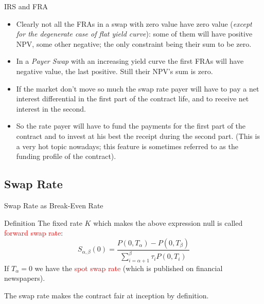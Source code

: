 \documentclass{beamer}
\begin{document}
\begin{frame}{IRS and FRA}
	\begin{itemize}
		\item<1-> Clearly not all the FRAs in a swap with zero value have zero value (\emph{except for the degenerate case of flat yield curve}): some of them will have positive NPV, some other negative; the only constraint being their sum to be zero.
		\item<2-> In a \emph{Payer Swap} with an increasing yield curve the first FRAs will have negative value, the last positive. Still their NPV's sum is zero.
		\item<3-> If the market don't move so much the swap rate payer will have to pay a net interest differential in the first part of the contract life, and to receive net interest in the second.
		\item<4-> So the rate payer will have to fund the payments for the first part of the contract and to invest at his best the receipt during the second part. (This is a very hot topic nowadays; this feature is sometimes referred to as the funding profile of the contract).
	\end{itemize}
\end{frame}

\subsection{Swap Rate}
\begin{frame}{Swap Rate as Break-Even Rate}
	\begin{block}{Definition}
	The fixed rate $K$ which makes the above expression null is called \textcolor{red}{forward swap rate}:
	\begin{equation}
		S_{\alpha,\beta}(0) = \frac{P(0, T_\alpha)-P(0,T_\beta)}{\sum_{i=\alpha+1}^{\beta}\tau_iP(0,T_i)}
	\end{equation}
	If $T_\alpha=0$ we have the \textcolor{red}{spot swap rate} (which is published on financial newspapers).
	\end{block}
	The swap rate makes the contract fair at inception by definition.
\end{frame}
\end{document}
